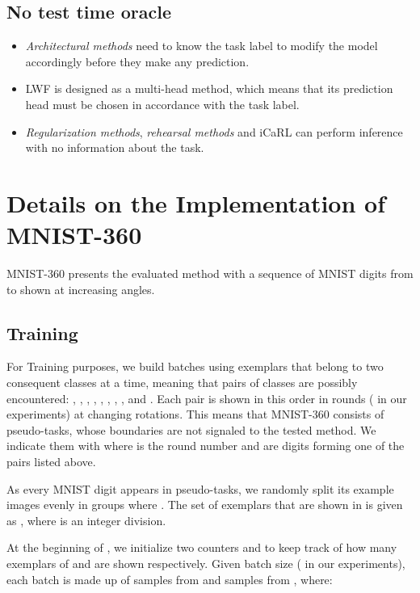 \documentclass{article}
\begin{document}
    \subsection{No test time oracle}
\begin{itemize}
        \item \textit{Architectural methods} need to know the task label to modify the model accordingly before they make any prediction.
        \item LWF is designed as a multi-head method, which means that its prediction head must be chosen in accordance with the task label.
        \item \textit{Regularization methods}, \textit{rehearsal methods} and iCaRL can perform inference with no information about the task.
    \end{itemize}
\newpage
\section{Details on the Implementation of MNIST-360}
\label{app:mnist360}

MNIST-360 presents the evaluated method with a sequence of MNIST digits from  to  shown at increasing angles.

\subsection{Training}

For Training purposes, we build batches using exemplars that belong to two consequent classes at a time, meaning that  pairs of classes are possibly encountered: , , , , , , , , and . Each pair is shown in this order in  rounds ( in our experiments) at changing rotations. This means that MNIST-360 consists of  pseudo-tasks, whose boundaries are not signaled to the tested method. We indicate them with  where  is the round number and  are digits forming one of the pairs listed above.

As every MNIST digit  appears in  pseudo-tasks, we randomly split its example images evenly in  groups  where . The set of exemplars that are shown in  is given as , where  is an integer division.

At the beginning of , we initialize two counters  and  to keep track of how many exemplars of  and  are shown respectively. Given batch size  ( in our experiments), each batch is made up of  samples from  and  samples from , where:
\end{document}
